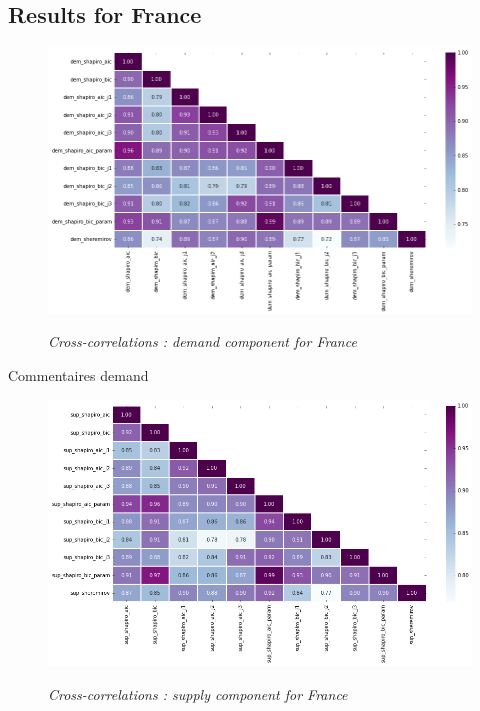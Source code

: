 \subsection{Results for France}

\begin{figure}[h!]
    \centering
    \caption{\textit{Cross-correlations : demand component for France}}
    \includegraphics[width=1\textwidth]{img/dem_heat.png}
    \label{figure:dem_heat}
\end{figure}

Commentaires demand

\newpage

\begin{figure}[h!]
    \centering
    \caption{\textit{Cross-correlations : supply component for France}}
    \includegraphics[width=1\textwidth]{img/sup_heat.png}
    \label{figure:sup_heat}
\end{figure}
